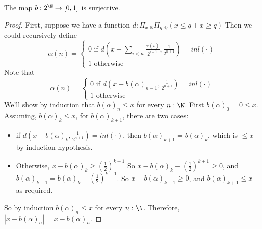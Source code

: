 \begin{lemma}
  The map $b: 2^\N \to [0,1]$ is surjective. 
\end{lemma}
\begin{proof}
  First, suppose we have a function 
  $d:\Pi_{x:\mathbb R} \Pi_{q: \mathbb Q} (x \leq q + x \geq q)$
  Then we could recursively define 
  $$\alpha(n) = \begin{cases}
    0 \text{ if } d(x - \sum\limits_{i<n} \frac{\alpha(i)}{2^{i+1}} , \frac{1}{2^{n+1}}) = inl(\cdot) \\
    1 \text{ otherwise}
  \end{cases}
  $$
  Note that 
  $$\alpha(n) = \begin{cases}
    0 \text{ if } d(x - b(\alpha)_{n-1} , \frac{1}{2^{n+1}}) = inl(\cdot) \\
    1 \text{ otherwise}
  \end{cases}
  $$
  We'll show by induction that $b(\alpha)_n \leq x$ for every $n:\N$. 
  First $b(\alpha)_0 = 0 \leq x$. 
  Assuming, $b(\alpha)_k \leq x$, for $b(\alpha)_{k+1}$, 
  there are two cases:
  \begin{itemize}
    \item 
     if $d(x -  b(\alpha)_k, \frac{1}{2^{n+1}}) = inl(\cdot)$, 
     then $b(\alpha)_{k+1} = b(\alpha)_k$, which is $\leq x$ by induction hypothesis. 
   \item 
     Otherwise, $ x - b(\alpha)_k \geq (\frac12)^{k+1}$
     So $x-b(\alpha)_k - (\frac12)^{k+1} \geq 0$, 
     and $b(\alpha)_{k+1} = b(\alpha)_k + (\frac12)^{k+1}$. 
     So $x-b(\alpha)_{k+1} \geq 0$, and $b(\alpha)_{k+1} \leq x$ as required. 
 \end{itemize}
 So by induction $b(\alpha)_n\leq x$ for every $n:\N$. 
 Therefore, $|x-b(\alpha)_n| = x-b(\alpha)_n$. 
  

\end{proof}
